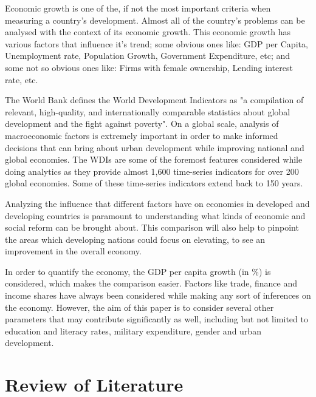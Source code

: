 \documentclass[conference]{IEEEtran}
\begin{document}
Economic growth is one of the, if not the most important criteria when measuring a country’s development. Almost all of the country’s problems can be analysed with the context of its economic growth. This economic growth has various factors that influence it’s trend; some obvious ones like: GDP per Capita, Unemployment rate, Population Growth, Government Expenditure, etc; and some not so obvious ones like: Firms with female ownership, Lending interest rate, etc.

The World Bank defines the World Development Indicators as "a compilation of relevant, high-quality, and internationally comparable statistics about global development and the fight against poverty". On a global scale, analysis of macroeconomic factors is extremely important in order to make informed decisions that can bring about urban development while improving national and global economies. The WDIs are some of the foremost features considered while doing analytics as they provide almost 1,600 time-series indicators for over 200 global economies. Some of these time-series indicators extend back to 150 years. 

Analyzing the influence that different factors have on economies in developed and developing countries is paramount to understanding what kinds of economic and social reform can be brought about. This comparison will also help to pinpoint the areas which developing nations could focus on elevating, to see an improvement in the overall economy. 

In order to quantify the economy, the GDP per capita growth (in \%) is considered, which makes the comparison easier.  Factors like trade, finance and income shares have always been considered while making any sort of inferences on the economy. However, the aim of this paper is to consider several other parameters that may contribute significantly as well, including but not limited to education and literacy rates, military expenditure, gender and urban development.



\section{Review of Literature}
\end{document}
